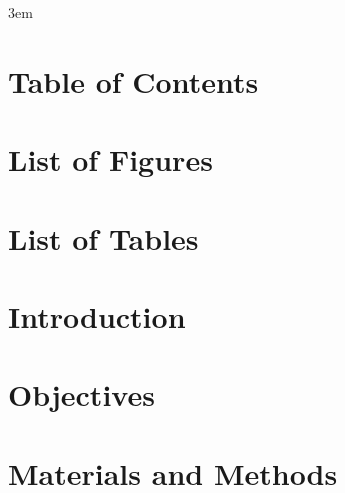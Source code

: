 \documentclass[10pt,twoside]{book}
\begin{document}
\emergencystretch 3em

\frontmatter



% 

% 

\chapter{Table of Contents}
\tableofcontents %
\clearpage

\chapter{List of Figures}
\listoffigures
\clearpage

\chapter{List of Tables}
\listoftables
\clearpage

% 

\mainmatter

\chapter{Introduction}
\clearpage


\clearpage

\chapter{Objectives}
\clearpage


\clearpage

\chapter{Materials and Methods}
\clearpage
\end{document}
